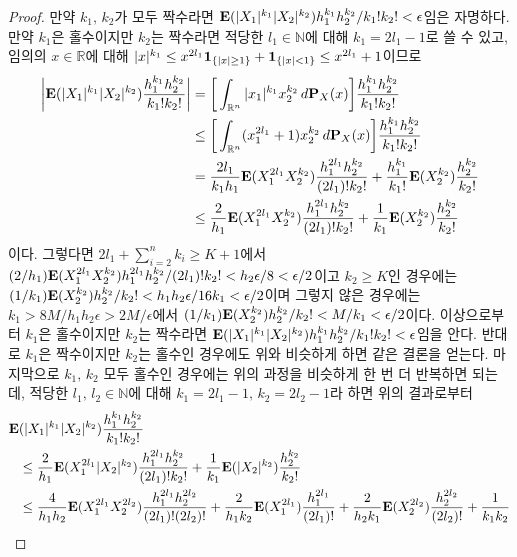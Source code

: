 \begin{proof}
    만약 $k_1,\,k_2$가 모두 짝수라면 $\mathbf{E}(|X_1|^{k_1}|X_2|^{k_2})h_1^{k_1}h_2^{k_2}/k_1!k_2!<\epsilon$임은 자명하다. 만약 $k_1$은 홀수이지만 $k_2$는 짝수라면 적당한 $l_1\in\mathbb{N}$에 대해 $k_1=2l_1-1$로 쓸 수 있고, 임의의 $x\in\mathbb{R}$에 대해 $|x|^{k_1}\leq x^{2l_1}\mathbf{1}_{\{|x|\geq1\}}+\mathbf{1}_{\{|x|<1\}}\leq x^{2l_1}+1$이므로
    \begin{align*}
        \bigg|\mathbf{E}(|X_1|^{k_1}|X_2|^{k_2})\frac{h_1^{k_1}h_2^{k_2}}{k_1!k_2!}\bigg|&=\bigg[\int_{\mathbb{R}^n}|x_1|^{k_1}x_2^{k_2}\,d\mathbf{P}_X(x)\bigg]\frac{h_1^{k_1}h_2^{k_2}}{k_1!k_2!}\\
        &\leq\bigg[\int_{\mathbb{R}^n}(x_1^{2l_1}+1)x_2^{k_2}\,d\mathbf{P}_X(x)\bigg]\frac{h_1^{k_1}h_2^{k_2}}{k_1!k_2!}\\
        &=\frac{2l_1}{k_1h_1}\mathbf{E}(X_1^{2l_1}X_2^{k_2})\frac{h_1^{2l_1}h_2^{k_2}}{(2l_1)!k_2!}+\frac{h_1^{k_1}}{k_1!}\mathbf{E}(X_2^{k_2})\frac{h_2^{k_2}}{k_2!}\\
        &\leq\frac{2}{h_1}\mathbf{E}(X_1^{2l_1}X_2^{k_2})\frac{h_1^{2l_1}h_2^{k_2}}{(2l_1)!k_2!}+\frac{1}{k_1}\mathbf{E}(X_2^{k_2})\frac{h_2^{k_2}}{k_2!}
    \end{align*}
    이다. 그렇다면 $2l_1+\sum_{i=2}^nk_i\geq K+1$에서 $(2/h_1)\mathbf{E}(X_1^{2l_1}X_2^{k_2})h_1^{2l_1}h_2^{k_2}/(2l_1)!k_2!<h_2\epsilon/8<\epsilon/2$이고 $k_2\geq K$인 경우에는 $(1/k_1)\mathbf{E}(X_2^{k_2})h_2^{k_2}/k_2!<h_1h_2\epsilon/16k_1<\epsilon/2$이며 그렇지 않은 경우에는 $k_1>8M/h_1h_2\epsilon>2M/\epsilon$에서 $(1/k_1)\mathbf{E}(X_2^{k_2})h_2^{k_2}/k_2!<M/k_1<\epsilon/2$이다. 이상으로부터 $k_1$은 홀수이지만 $k_2$는 짝수라면 $\mathbf{E}(|X_1|^{k_1}|X_2|^{k_2})h_1^{k_1}h_2^{k_2}/k_1!k_2!<\epsilon$임을 안다. 반대로 $k_1$은 짝수이지만 $k_2$는 홀수인 경우에도 위와 비슷하게 하면 같은 결론을 얻는다. 마지막으로 $k_1,\,k_2$ 모두 홀수인 경우에는 위의 과정을 비슷하게 한 번 더 반복하면 되는데, 적당한 $l_1,\,l_2\in\mathbb{N}$에 대해 $k_1=2l_1-1,\,k_2=2l_2-1$라 하면 위의 결과로부터
    \begin{align*}
        \mathbf{E}&(|X_1|^{k_1}|X_2|^{k_2})\frac{h_1^{k_1}h_2^{k_2}}{k_1!k_2!}\\
        &\leq\frac{2}{h_1}\mathbf{E}(X_1^{2l_1}|X_2|^{k_2})\frac{h_1^{2l_1}h_2^{k_2}}{(2l_1)!k_2!}+\frac{1}{k_1}\mathbf{E}(|X_2|^{k_2})\frac{h_2^{k_2}}{k_2!}\\
        &\leq\frac{4}{h_1h_2}\mathbf{E}(X_1^{2l_1}X_2^{2l_2})\frac{h_1^{2l_1}h_2^{2l_2}}{(2l_1)!(2l_2)!}+\frac{2}{h_1k_2}\mathbf{E}(X_1^{2l_1})\frac{h_1^{2l_1}}{(2l_1)!}+\frac{2}{h_2k_1}\mathbf{E}(X_2^{2l_2})\frac{h_2^{2l_2}}{(2l_2)!}+\frac{1}{k_1k_2}
    \end{align*}

\end{proof}
